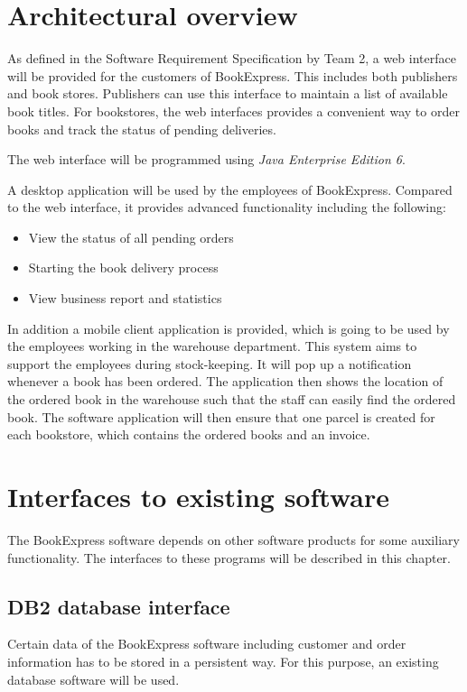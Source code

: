 \chapter{Architectural overview}
As defined in the Software Requirement Specification by Team 2, a web interface will be provided for the customers of BookExpress. This includes both publishers and book stores. Publishers can use this interface to maintain a list of available book titles. For bookstores, the web interfaces provides a convenient way to order books and track the status of pending deliveries.

The web interface will be programmed using \emph{Java Enterprise Edition 6}.

A desktop application will be used by the employees of BookExpress. Compared to the web interface, it provides advanced functionality including the following:
\begin{itemize}
\item View the status of all pending orders
\item Starting the book delivery process
\item View business report and statistics
\end{itemize}

In addition a mobile client application is provided, which is going to be used by the employees working in the warehouse department. This system aims to support the employees during stock-keeping. It will pop up a notification whenever a book has been ordered. The application then shows the location of the ordered book in the warehouse such that the staff can easily find the ordered book. The software application will then ensure that one parcel is created for each bookstore, which contains the ordered books and an invoice.

\chapter{Interfaces to existing software}
The BookExpress software depends on other software products for some auxiliary functionality. The interfaces to these programs will be described in this chapter.
\section{DB2 database interface}
Certain data of the BookExpress software including customer and order information has to be stored in a persistent way. For this purpose, an existing database software will be used.

